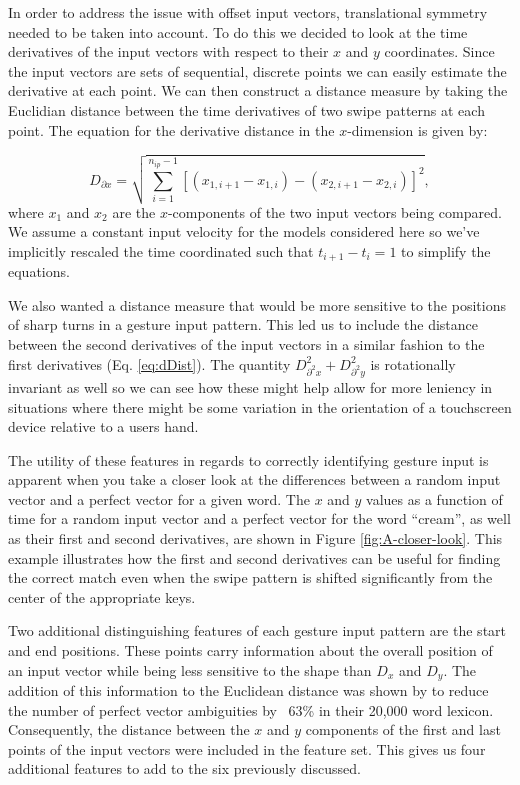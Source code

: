 \documentclass[final,1p,times,authoryear]{elsarticle}
\begin{document}
In order to address the issue with offset input vectors, translational
symmetry needed to be taken into account. To do this we decided to
look at the time derivatives of the input vectors with respect to
their $x$ and $y$ coordinates. Since the input vectors are sets
of sequential, discrete points we can easily estimate the derivative
at each point. We can then construct a distance measure by taking
the Euclidian distance between the time derivatives of two swipe patterns
at each point. The equation for the derivative distance in the $x$-dimension
is given by:

\begin{equation}
D_{\partial x}=\sqrt{{\sum_{i=1}^{n_{ip}-1}\left[(x_{1,i+1}-x_{1,i})-(x_{2,i+1}-x_{2,i})\right]^{2}}},\label{eq:dDist}
\end{equation}
where $x_{1}$ and $x_{2}$ are the $x$-components of the two input
vectors being compared. We assume a constant input velocity for the
models considered here so we've implicitly rescaled the time coordinated
such that $t_{i+1}-t_{i}=1$ to simplify the equations.

We also wanted a distance measure that would be more sensitive to
the positions of sharp turns in a gesture input pattern. This led us to include
the distance between the second derivatives of the input vectors
in a similar fashion to the first derivatives (Eq. \ref{eq:dDist}).
The quantity $D_{\partial^{2}x}^{2}+D_{\partial^{2}y}^{2}$ is rotationally
invariant as well so we can see how these might help allow for more
leniency in situations where there might be some variation in the
orientation of a touchscreen device relative to a users hand.

The utility of these features in regards to correctly identifying
gesture input is apparent when you take a closer look at the differences
between a random input vector and a perfect vector for a given word.
The $x$ and $y$ values as a function of time for a random input
vector and a perfect vector for the word ``cream'', as well as their
first and second derivatives, are shown in Figure \ref{fig:A-closer-look}.
This example illustrates how the first and second derivatives can
be useful for finding the correct match even when the swipe pattern
is shifted significantly from the center of the appropriate keys.

Two additional distinguishing features of each gesture input pattern are the
start and end positions. These points carry information about the
overall position of an input vector while being less sensitive to
the shape than $D_{x}$ and $D_{y}$. The addition of this information to the Euclidean distance was
shown by \cite{SHARK2} to reduce the number of perfect vector ambiguities by ~63\% 
in their 20,000 word lexicon. Consequently, the distance
between the $x$ and $y$ components of the first and last points
of the input vectors were included in the feature set. This gives us four additional
features to add to the six previously discussed.
\end{document}
